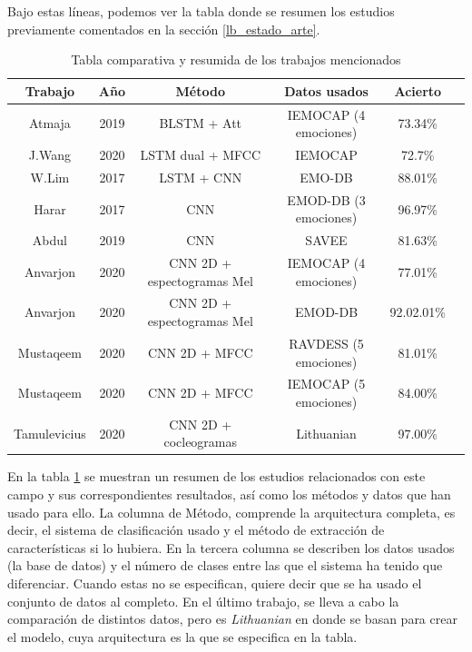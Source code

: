 \documentclass[11pt,a4paper,spanish]{book}
\begin{document}
	 
	 Bajo estas líneas, podemos ver la tabla donde se resumen los estudios previamente comentados en la sección \ref{lb_estado_arte}.\\
	 
	 \begin{table}[H]
	 	\centering
	 	\begin{center}
	 		\begin{tabular}{| c | c | c | c| c | c|}
	 			\hline
	 			Trabajo & Año & Método &  Datos usados  & Acierto \\ 
	 			\hline
	 			Atmaja & 2019 &   BLSTM + Att  & IEMOCAP (4 emociones) & 73.34\% 	\\
	 			J.Wang & 2020 & LSTM dual + MFCC & IEMOCAP & 72.7\% \\
	 			W.Lim & 2017 &   LSTM + CNN & EMO-DB &  88.01\%		\\ 
	 			Harar & 2017 &  CNN & EMOD-DB (3 emociones) &  96.97\%			\\
	 			Abdul & 2019 & CNN & SAVEE & 81.63\%				\\
	 			Anvarjon & 2020 & CNN 2D + espectogramas Mel & IEMOCAP (4 emociones) & 77.01\%\\
	 			Anvarjon & 2020 & CNN 2D + espectogramas Mel & EMOD-DB & 92.02.01\%\\
	 			Mustaqeem & 2020 & CNN 2D + MFCC & RAVDESS (5 emociones) & 81.01\% \\
	 			Mustaqeem & 2020 & CNN 2D + MFCC & IEMOCAP (5 emociones) & 84.00\% \\  
	 			Tamulevicius & 2020 & CNN 2D + cocleogramas & Lithuanian & 97.00\% \\
	 			\hline	
	 		\end{tabular}
	 		
	 		\caption{Tabla comparativa y resumida de los trabajos mencionados}
	 		\label{tab:metod_comp}
	 	\end{center}
	 \end{table}
	 
	 En la tabla \ref{tab:metod_comp} se muestran un resumen de los estudios relacionados con este campo y sus correspondientes resultados, así como los métodos y datos que han usado para ello. La columna de Método, comprende la arquitectura completa, es decir, el sistema de clasificación usado y el método de extracción de características si lo hubiera. En la tercera columna se describen los datos usados (la base de datos) y el número de clases entre las que el sistema ha tenido que diferenciar. Cuando estas no se especifican, quiere decir que se ha usado el conjunto de datos al completo.
	 En el último trabajo, \cite{Tamulevicius2020} se lleva a cabo la comparación de distintos datos, pero es \emph{Lithuanian} en donde se basan para crear el modelo, cuya arquitectura es la que se especifica en la tabla.\\
	
\end{document}
